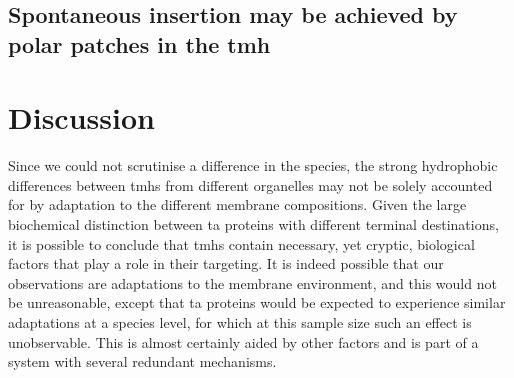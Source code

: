 
\subsection{Spontaneous insertion may be achieved by polar patches in the \gls{tmh}}






\section{Discussion}

Since we could not scrutinise a difference in the species, the strong hydrophobic differences between \gls{tmh}s from different organelles may not be solely accounted for by adaptation to the different membrane compositions.
Given the large biochemical distinction between \gls{ta} proteins with different terminal destinations, it is possible to conclude that \gls{tmh}s contain necessary, yet cryptic, biological factors that play a role in their targeting.
It is indeed possible that our observations are adaptations to the membrane environment, and this would not be unreasonable, except that \gls{ta} proteins would be expected to experience similar adaptations at a species level, for which at this sample size such an effect is unobservable.
This is almost certainly aided by other factors and is part of a system with several redundant mechanisms.

